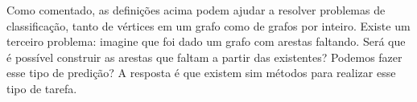 \documentclass{article}
\begin{document}
Como comentado, as definições acima podem ajudar a resolver problemas de classificação, tanto de vértices em um grafo como de grafos por inteiro. Existe um terceiro problema: imagine que foi dado um grafo com arestas faltando. Será que é possível construir as arestas que faltam a partir das existentes? Podemos fazer esse tipo de predição? A resposta é que existem sim métodos para realizar esse tipo de tarefa.

\nocite{*}
\printbibliography
\end{document}
